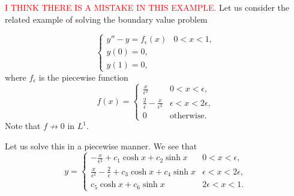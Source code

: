 
\begin{example}
\textcolor{red}{I THINK THERE IS A MISTAKE IN THIS EXAMPLE.}
Let us consider the related example of solving the boundary value problem

\begin{equation}
\begin{cases}
y'' - y = f_\epsilon(x) & 0 < x < 1,\\
y(0) = 0,\\
y(1) = 0,
\end{cases}
\end{equation}
where $f_\epsilon$ is the piecewise function
\begin{equation}
f(x) = \begin{cases}
\frac{x}{\epsilon^2} & 0 < x < \epsilon,\\
\frac{2}{\epsilon} - \frac{x}{\epsilon^2} & \epsilon< x< 2\epsilon,\\
0 & \text{otherwise}.
\end{cases}
\end{equation}
Note that $f \not \to 0$ in $L^1$.

Let us solve this in a piecewise manner. We see that
\begin{equation}
y = \begin{cases}
-\frac{x}{\epsilon^2} + c_1 \cosh x + c_2 \sinh x & 0<x<\epsilon,\\
\frac{x}{\epsilon^2} - \frac{2}{\epsilon} + c_3 \cosh x + c_4 \sinh x & \epsilon < x < 2\epsilon,\\
c_5 \cosh x + c_6 \sinh x & 2\epsilon < x < 1.
\end{cases}
\end{equation}


\end{example}
